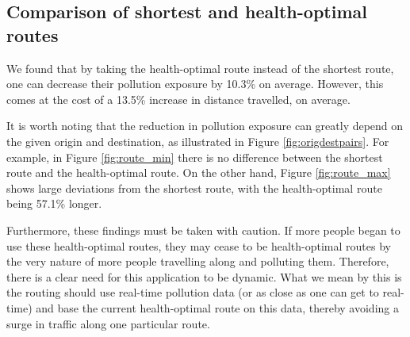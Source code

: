 \documentclass[11pt]{report}
\begin{document}
\subsection{Comparison of shortest and health-optimal routes}

We found that by taking the health-optimal route instead of the shortest route, one can decrease their pollution exposure by 10.3\% on average. However, this comes at the cost of a 13.5\% increase in distance travelled, on average.


It is worth noting that the reduction in pollution exposure can greatly depend on the given origin and destination, as illustrated in Figure \ref{fig:origdestpairs}. For example, in Figure \ref{fig:route_min} there is no difference between the shortest route and the health-optimal route. On the other hand, Figure \ref{fig:route_max} shows large deviations from the shortest route, with the health-optimal route being 57.1\% longer.

Furthermore, these findings must be taken with caution. If more people began to use these health-optimal routes, they may cease to be health-optimal routes by the very nature of more people travelling along and polluting them. Therefore, there is a clear need for this application to be dynamic. What we mean by this is the routing should use real-time pollution data (or as close as one can get to real-time) and base the current health-optimal route on this data, thereby avoiding a surge in traffic along one particular route.
\end{document}
